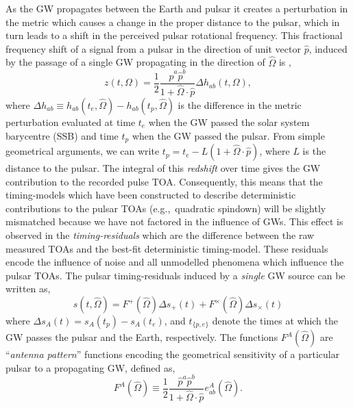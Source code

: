 \documentclass[prd,twocolumn,showpacs,nofootinbib]{revtex4}
\begin{document}
As the GW propagates between the Earth and pulsar it creates a perturbation in the metric which causes a change in the proper distance to the pulsar, which in turn leads to a shift in the perceived pulsar rotational frequency. This fractional frequency shift of a signal from a pulsar in the direction of unit vector $\hat{p}$, induced by the passage of a single GW propagating in the direction of $\hat\Omega$ is \citep{anholm-2009,brook-flanagan-2011},
\begin{equation}
z(t,\Omega) = \frac{1}{2}\frac{\hat{p}^a\hat{p}^b}{1+\hat\Omega\cdot\hat{p}}\Delta h_{ab}(t,\Omega),
\end{equation}
where $\Delta h_{ab}\equiv h_{ab}(t_e,\hat\Omega) - h_{ab}(t_p,\hat\Omega)$ is the difference in the metric perturbation evaluated at time $t_e$ when the GW passed the solar system barycentre (SSB) and time $t_p$ when the GW passed the pulsar.
From simple geometrical arguments, we can write $t_p = t_e - L(1+\hat\Omega\cdot\hat{p})$, where $L$ is the distance to the pulsar. The integral of this {\it redshift} over time gives the GW contribution to the recorded pulse TOA. 
Consequently, this means that the timing-models which have been constructed to describe deterministic contributions to the pulsar TOAs (e.g.,\ quadratic spindown) will be slightly mismatched because we have not factored in the influence of GWs. This effect is observed in the {\it timing-residuals} which are the difference between the raw measured TOAs and the best-fit deterministic timing-model. These residuals encode the influence of noise and all unmodelled phenomena which influence the pulsar TOAs. The pulsar timing-residuals induced by a {\it single} GW source can be written as,
\begin{equation} \label{eq:GWinducedresiduals}
s(t,\hat\Omega) = F^+(\hat\Omega)\Delta s_+(t) + F^\times(\hat\Omega)\Delta s_\times(t)
\end{equation}
where $\Delta s_A(t) = s_A(t_p) - s_A(t_e)$, and $t_{\{p,e\}}$ denote the times at which the GW passes the pulsar and the Earth, respectively. The functions $F^A(\hat\Omega)$ are ``{\it antenna pattern}'' functions encoding the geometrical sensitivity of a particular pulsar to a propagating GW, defined as,
\begin{equation}
F^A(\hat\Omega)\equiv \frac{1}{2}\frac{\hat{p}^a\hat{p}^b}{1+\hat\Omega\cdot\hat{p}}e^A_{ab}(\hat\Omega).
\end{equation}
\end{document}
